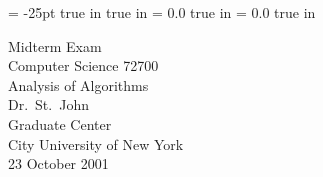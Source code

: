 \pagestyle{empty}
\topmargin= -25pt
 true in
 true in
\oddsidemargin = 0.0 true in
\evensidemargin = 0.0 true in
\newcommand{\ul}{\underline}
\newcommand{\spa}{\hspace{.25in}}


{\large
\begin{center}
    Midterm Exam\\
    Computer Science 72700\\
    Analysis of Algorithms\\
    Dr.~St.~John\\ 
    Graduate Center\\
    City University of New York\\ 
    23 October 2001
\end{center}
}


